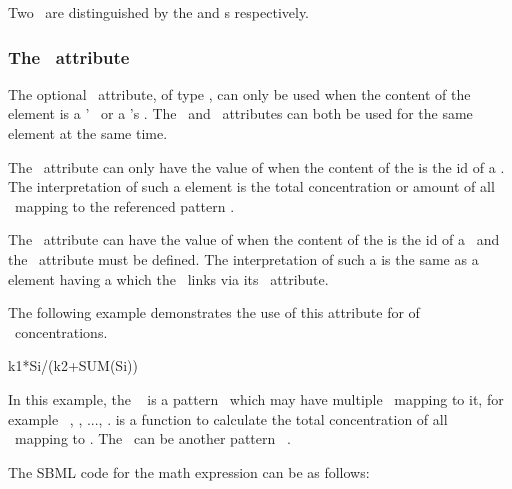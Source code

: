 Two  \species\ are distinguished by the  and  \speciesReference s respectively. 

\subsubsection{The \representationTypeAtt\ attribute}
\label{def:Reaction:Math:ci:representationType}

The optional \representationTypeAtt\ attribute, of type \RepresentationTypePTWC, can only be used when the content of the  element is a \species' \idAtt\ or a \possibleSpeciesFeatureValue's \idAtt. The \representationTypeAtt\ and \speciesReferenceAtt\ attributes can both be used for the same  element at the same time. 

The \representationTypeAtt\ attribute can only have the value of  when the content of the  is the id of a \species. The interpretation of such a  element is the total concentration or amount of all \fullydefinedspeciesWC\ mapping to the referenced pattern \species.   

The \representationTypeAtt\ attribute can have the value of  when the content of the  is the id of a \possibleSpeciesFeatureValue\ and the \speciesReferenceAtt\ attribute must be defined. The interpretation of such a  is the same as a  element having a  which the \possibleSpeciesFeatureValue\ links via its \numericValueAtt\ attribute.   

The following example demonstrates the use of this attribute for  of \species\ concentrations.

\begin{example}[style=latex]
    k1*Si/(k2+SUM(Si)) 
\end{example}

In this example, the \reactant\  is a pattern \species\ which may have multiple \fullydefinedspecies\ mapping to it, for example \species\ , , ..., .   is a function to calculate the total concentration of all \fullydefinedspecies\ mapping to . The \product\ can be another pattern \species\ . 

The SBML code for the math expression can be as follows:


